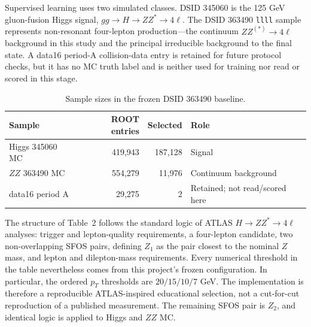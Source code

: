 \documentclass[11pt,a4paper]{article}
\begin{document}
Supervised learning uses two simulated classes. DSID 345060 is the 125 GeV gluon-fusion Higgs signal, $gg\to H\to ZZ^{*}\to4\ell$. The DSID 363490 \texttt{llll} sample represents non-resonant four-lepton production---the continuum $ZZ^{(*)}\to4\ell$ background in this study and the principal irreducible background to the final state. A data16 period-A collision-data entry is retained for future protocol checks, but it has no MC truth label and is neither used for training nor read or scored in this stage.

\begin{table}[ht]
\centering
\caption{Sample sizes in the frozen DSID 363490 baseline.}
\begin{tabular}{lrrl}
\toprule
Sample & ROOT entries & Selected & Role\\
\midrule
Higgs 345060 MC & 419,943 & 187,128 & Signal\\
$ZZ$ 363490 MC & 554,279 & 11,976 & Continuum background\\
data16 period A & 29,275 & 2 & Retained; not read/scored here\\
\bottomrule
\end{tabular}
\end{table}

The structure of Table~2 follows the standard logic of ATLAS $H\to ZZ^{*}\to4\ell$ analyses: trigger and lepton-quality requirements, a four-lepton candidate, two non-overlapping SFOS pairs, defining $Z_1$ as the pair closest to the nominal $Z$ mass, and lepton and dilepton-mass requirements\cite{atlas-h4l-run1,atlas-open-data-hzz}. Every numerical threshold in the table nevertheless comes from this project's frozen configuration. In particular, the ordered $p_T$ thresholds are $20/15/10/7$ GeV. The implementation is therefore a reproducible ATLAS-inspired educational selection, not a cut-for-cut reproduction of a published measurement. The remaining SFOS pair is $Z_2$, and identical logic is applied to Higgs and $ZZ$ MC.
\end{document}
